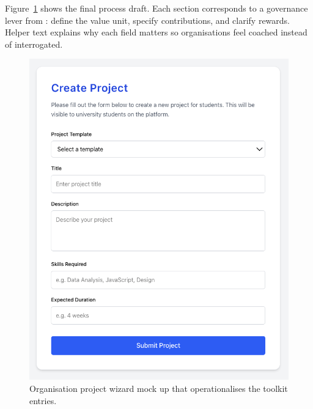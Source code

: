 Figure~\ref{fig:project-creation} shows the final process draft. Each section corresponds to a governance lever from \citet{Reillier2017}: define the value unit, specify contributions, and clarify rewards. Helper text explains why each field matters so organisations feel coached instead of interrogated.

\begin{figure}[H]
  \centering
  \includegraphics[width=0.85\linewidth]{figures/Organisation-generate-project.png}
  \caption{Organisation project wizard mock up that operationalises the toolkit entries.}
  \label{fig:project-creation}
\end{figure}
